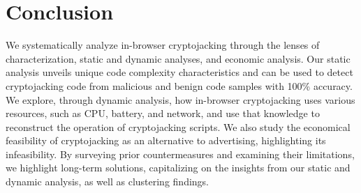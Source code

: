 \documentclass[acmlarge]{acmart}
\newcommand{\cj}{cryptojacking\xspace}
\begin{document}
\section{Conclusion} \label{sec:conclusion}
We systematically analyze in-browser cryptojacking through the lenses of characterization, static and dynamic analyses, and economic analysis. Our static analysis unveils unique code complexity characteristics and can be used to detect \cj code from malicious and benign code samples with 100\% accuracy. We explore, through dynamic analysis, how in-browser \cj uses various resources, such as CPU, battery, and network, and use that knowledge to reconstruct the operation of \cj scripts. We also study the economical feasibility of \cj as an alternative to advertising, highlighting its infeasibility. By surveying prior countermeasures and examining their limitations, we highlight long-term solutions, capitalizing on the insights from our static and dynamic analysis, as well as clustering findings. 




\balance







\end{document}
